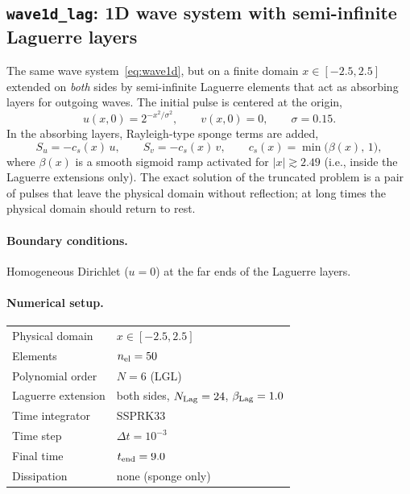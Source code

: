 \documentclass[11pt,a4paper]{article}
\begin{document}
\subsection{\texttt{wave1d\_lag}: 1D wave system with semi-infinite
Laguerre layers}
The same wave system~\eqref{eq:wave1d}, but on a finite domain
$x \in [-2.5, 2.5]$ extended on \emph{both} sides by semi-infinite
Laguerre elements that act as absorbing layers for outgoing waves. The
initial pulse is centered at the origin,
\begin{equation}
  u(x, 0) = 2^{-x^2/\sigma^2},
  \qquad
  v(x, 0) = 0,
  \qquad \sigma = 0.15 .
\end{equation}
In the absorbing layers, Rayleigh-type sponge terms are added,
\begin{equation}
  S_u = -c_s(x)\, u,
  \qquad
  S_v = -c_s(x)\, v,
  \qquad
  c_s(x) = \min\!\bigl(\beta(x),\, 1\bigr),
\end{equation}
where $\beta(x)$ is a smooth sigmoid ramp activated for $|x| \gtrsim
2.49$ (i.e., inside the Laguerre extensions only). The exact solution of
the truncated problem is a pair of pulses that leave the physical domain
without reflection; at long times the physical domain should return to
rest.

\paragraph{Boundary conditions.} Homogeneous Dirichlet ($u = 0$) at the
far ends of the Laguerre layers.

\paragraph{Numerical setup.}
\begin{center}
\begin{tabular}{ll}
\toprule
Physical domain       & $x \in [-2.5, 2.5]$ \\
Elements              & $n_{\rm el} = 50$ \\
Polynomial order      & $N = 6$ (LGL) \\
Laguerre extension    & both sides, $N_{\rm Lag} = 24$,
                        $\beta_{\rm Lag} = 1.0$ \\
Time integrator       & SSPRK33 \\
Time step             & $\Delta t = 10^{-3}$ \\
Final time            & $t_{\rm end} = 9.0$ \\
Dissipation           & none (sponge only) \\
\bottomrule
\end{tabular}
\end{center}
\end{document}
